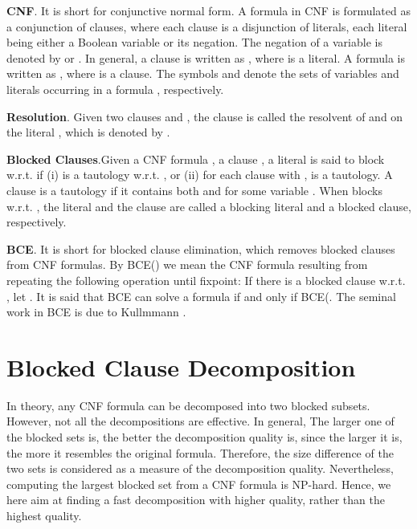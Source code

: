 \documentclass{llncs}
\begin{document}
\vspace{0.5em}
\noindent \textbf{CNF}. It is short for conjunctive
normal form. A formula in CNF is formulated as a conjunction of
clauses, where each clause is a disjunction of literals, each
literal being either a Boolean variable or its negation. The
negation of a variable  is denoted by  or .
 In general, a clause  is written as , where  is a literal. A
formula  is written as , where
 is a clause. The symbols  and
 denote the sets of variables and literals occurring in a
formula , respectively.

\vspace{0.5em}

\noindent \textbf{Resolution}. Given two clauses  and , the clause  is called the resolvent of  and  on the literal
,  which is denoted by .

\vspace{0.5em}

\noindent \textbf{Blocked Clauses}.Given a CNF formula , a clause
, a literal  is said to block  w.r.t.  if (i) 
is a tautology w.r.t. ,  or (ii) for each clause  with
,  is a tautology. A clause is a
tautology if it contains both  and  for some variable
. When  blocks  w.r.t. , the literal  and the clause
 are called a blocking literal and a blocked clause,
respectively.

\vspace{0.5em} \noindent \textbf{BCE}. It is short for blocked
clause elimination, which removes blocked clauses from CNF formulas.
By BCE() we mean the CNF formula resulting from repeating the
following operation until fixpoint: If there is a blocked clause  w.r.t. , let . It is said that BCE can
solve a formula  if and only if BCE(. The seminal
work in BCE is due to Kullmmann \cite{BCE:99}.

\section{Blocked Clause Decomposition}

In theory,  any CNF formula can be decomposed into two blocked
subsets. However, not all the decompositions are effective. In
general, The larger one of the blocked sets is, the better the
decomposition quality is, since the larger it is, the more it
resembles the original formula. Therefore, the size difference of
the two sets is considered as a measure of the decomposition
quality. Nevertheless, computing the largest blocked set from a CNF
formula is NP-hard. Hence, we here aim at finding a fast
decomposition with higher quality, rather than the highest quality.
\end{document}
